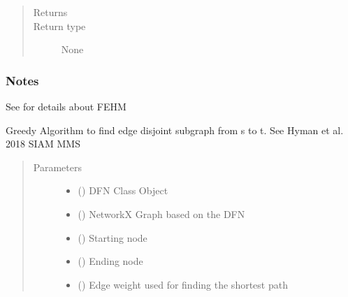 \documentclass[letterpaper,10pt,english]{sphinxmanual}
\begin{document}
\begin{fulllineitems}
\begin{fulllineitems}
\begin{quote}
\begin{description}
\item[{Returns}] \leavevmode


\item[{Return type}] \leavevmode
None

\end{description}\end{quote}
\subsubsection*{Notes}

See  for details about FEHM

\end{fulllineitems}


\begin{fulllineitems}
\label{\detokenize{pydfnworks:pydfnworks.general.dfnworks.DFNWORKS.greedy_edge_disjoint}}
Greedy Algorithm to find edge disjoint subgraph from s to t.
See Hyman et al. 2018 SIAM MMS
\begin{quote}\begin{description}
\item[{Parameters}] \leavevmode\begin{itemize}
\item {} 
 () \textendash{} DFN Class Object

\item {} 
 () \textendash{} NetworkX Graph based on the DFN

\item {} 
 () \textendash{} Starting node

\item {} 
 () \textendash{} Ending node

\item {} 
 () \textendash{} Edge weight used for finding the shortest path


\end{itemize}
\end{description}
\end{quote}
\end{fulllineitems}
\end{fulllineitems}
\end{document}
